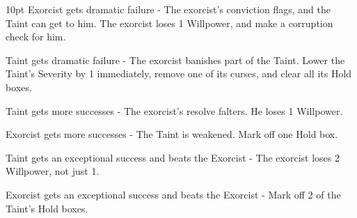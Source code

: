   \begin{myindentpar}{10pt}  Exorcist gets dramatic failure - The exorcist's conviction flags, and the Taint can get to him. The exorcist loses 1 Willpower, and make a corruption check for him.
  
    Taint gets dramatic failure - The exorcist banishes part of the Taint. Lower the Taint's Severity by 1 immediately, remove one of its curses, and clear all its Hold boxes.
    
    Taint gets more successes - The exorcist's resolve falters. He loses 1 Willpower. 
    
    Exorcist gets more successes - The Taint is weakened. Mark off one Hold box.
    
    Taint gets an exceptional success and beats the Exorcist - The exorcist loses 2 Willpower, not just 1.
    
    Exorcist gets an exceptional success and beats the Exorcist - Mark off 2 of the Taint's Hold boxes.\end{myindentpar}

